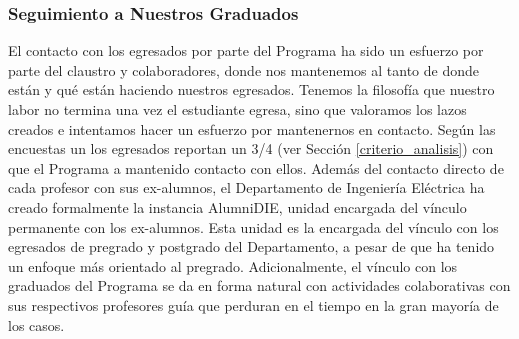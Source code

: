 



\subsubsection{Seguimiento a Nuestros Graduados}

El contacto con los egresados por parte del Programa ha sido un esfuerzo por parte del claustro 
y colaboradores, donde nos mantenemos al tanto de donde están y qué están haciendo nuestros 
egresados. Tenemos la filosofía que nuestro labor no termina una vez el estudiante egresa, sino 
que valoramos los lazos creados e intentamos hacer un esfuerzo por mantenernos en contacto. Según
las encuestas un los egresados reportan un 3/4 (ver Sección \ref{criterio_analisis}) con que 
el Programa a mantenido contacto con ellos. Además del contacto directo de cada profesor con sus 
ex-alumnos, el Departamento de Ingeniería Eléctrica ha creado formalmente la instancia AlumniDIE, 
unidad encargada del vínculo permanente con los ex-alumnos. Esta unidad es la encargada del vínculo 
con los egresados de pregrado y postgrado del Departamento, a pesar de que ha tenido un enfoque más
orientado al pregrado. Adicionalmente, el vínculo con los graduados del
Programa se da en forma natural con actividades colaborativas con sus respectivos profesores guía
que perduran en el tiempo en la gran mayoría de los casos. 


